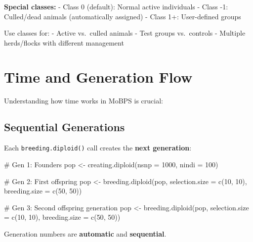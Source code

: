\documentclass[
  letterpaper,
]{book}
\newenvironment{Shaded}{\begin{snugshade}}{\end{snugshade}}
\newcommand{\AttributeTok}[1]{\textcolor[rgb]{0.40,0.45,0.13}{#1}}
\newcommand{\CommentTok}[1]{\textcolor[rgb]{0.37,0.37,0.37}{#1}}
\newcommand{\DecValTok}[1]{\textcolor[rgb]{0.68,0.00,0.00}{#1}}
\newcommand{\FunctionTok}[1]{\textcolor[rgb]{0.28,0.35,0.67}{#1}}
\newcommand{\NormalTok}[1]{\textcolor[rgb]{0.00,0.23,0.31}{#1}}
\newcommand{\OtherTok}[1]{\textcolor[rgb]{0.00,0.23,0.31}{#1}}
\begin{document}
\textbf{Special classes:} - Class 0 (default): Normal active individuals
- Class -1: Culled/dead animals (automatically assigned) - Class 1+:
User-defined groups

Use classes for: - Active vs.~culled animals - Test groups vs.~controls
- Multiple herds/flocks with different management

\section{Time and Generation Flow}\label{sec-time-flow}

Understanding how time works in MoBPS is crucial:

\subsection{Sequential Generations}\label{sequential-generations}

Each \texttt{breeding.diploid()} call creates the \textbf{next
generation}:

\begin{Shaded}
\begin{Highlighting}[]
\CommentTok{\# Gen 1: Founders}
\NormalTok{pop }\OtherTok{\textless{}{-}} \FunctionTok{creating.diploid}\NormalTok{(}\AttributeTok{nsnp =} \DecValTok{1000}\NormalTok{, }\AttributeTok{nindi =} \DecValTok{100}\NormalTok{)}

\CommentTok{\# Gen 2: First offspring}
\NormalTok{pop }\OtherTok{\textless{}{-}} \FunctionTok{breeding.diploid}\NormalTok{(pop,}
                        \AttributeTok{selection.size =} \FunctionTok{c}\NormalTok{(}\DecValTok{10}\NormalTok{, }\DecValTok{10}\NormalTok{),}
                        \AttributeTok{breeding.size =} \FunctionTok{c}\NormalTok{(}\DecValTok{50}\NormalTok{, }\DecValTok{50}\NormalTok{))}

\CommentTok{\# Gen 3: Second offspring generation}
\NormalTok{pop }\OtherTok{\textless{}{-}} \FunctionTok{breeding.diploid}\NormalTok{(pop,}
                        \AttributeTok{selection.size =} \FunctionTok{c}\NormalTok{(}\DecValTok{10}\NormalTok{, }\DecValTok{10}\NormalTok{),}
                        \AttributeTok{breeding.size =} \FunctionTok{c}\NormalTok{(}\DecValTok{50}\NormalTok{, }\DecValTok{50}\NormalTok{))}
\end{Highlighting}
\end{Shaded}

Generation numbers are \textbf{automatic} and \textbf{sequential}.
\end{document}
